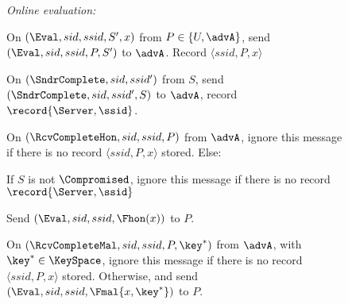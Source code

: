 \begin{figure}
{{            \emph{Online evaluation:}
            \begin{compactitem}
                \item On $(\Eval, sid, ssid, S', x)$ from $P \in \{U, \advA\}$, send $(\Eval, sid, ssid, P, S')$ to $\advA$. Record $\langle ssid,P,x\rangle$
                \item On $(\SndrComplete, sid, ssid')$ from $S$, send $(\SndrComplete, sid, ssid', S)$ to $\advA$, record $\record{\Server,\ssid}$.
                \item On $(\RcvCompleteHon, sid, ssid, P)$ from $\advA$, ignore this message if there is no record $\langle ssid,P,x\rangle$ stored. Else:
                \begin{compactitem}
                    \item If $S$ is not $\Compromised$, ignore this message if there is no record $\record{\Server,\ssid}$
                    \item Send $\left(\Eval,sid,ssid,\Fhon(x)\right)$ to $P$.
                \end{compactitem}
                \item On $(\RcvCompleteMal, sid, ssid, P, \key^*)$ from $\advA$, with $\key^* \in \KeySpace$, ignore this message if there is no record $\langle ssid,P,x\rangle$ stored. Otherwise,  and send $\left(\Eval,sid,ssid,\Fmal{x,\key^*}\right)$ to $P$. \\
            \end{compactitem}
        \vspace*{-0.3cm}
        }}
\end{figure}
